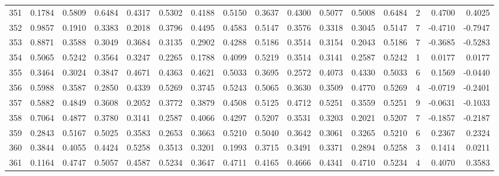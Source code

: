 \begin{tabular}{lrrrrrrrrrrrrrrr}
351 &      0.1784 &  0.5809 &  0.6484 &  0.4317 &  0.5302 &  0.4188 &  0.5150 &  0.3637 &  0.4300 &  0.5077 &   0.5008 &     0.6484 &      2 &                    0.4700 &                     0.4025 \\
352 &      0.9857 &  0.1910 &  0.3383 &  0.2018 &  0.3796 &  0.4495 &  0.4583 &  0.5147 &  0.3576 &  0.3318 &   0.3045 &     0.5147 &      7 &                   -0.4710 &                    -0.7947 \\
353 &      0.8871 &  0.3588 &  0.3049 &  0.3684 &  0.3135 &  0.2902 &  0.4288 &  0.5186 &  0.3514 &  0.3154 &   0.2043 &     0.5186 &      7 &                   -0.3685 &                    -0.5283 \\
354 &      0.5065 &  0.5242 &  0.3564 &  0.3247 &  0.2265 &  0.1788 &  0.4099 &  0.5219 &  0.3514 &  0.3141 &   0.2587 &     0.5242 &      1 &                    0.0177 &                     0.0177 \\
355 &      0.3464 &  0.3024 &  0.3847 &  0.4671 &  0.4363 &  0.4621 &  0.5033 &  0.3695 &  0.2572 &  0.4073 &   0.4330 &     0.5033 &      6 &                    0.1569 &                    -0.0440 \\
356 &      0.5988 &  0.3587 &  0.2850 &  0.4339 &  0.5269 &  0.3745 &  0.5243 &  0.5065 &  0.3630 &  0.3509 &   0.4770 &     0.5269 &      4 &                   -0.0719 &                    -0.2401 \\
357 &      0.5882 &  0.4849 &  0.3608 &  0.2052 &  0.3772 &  0.3879 &  0.4508 &  0.5125 &  0.4712 &  0.5251 &   0.3559 &     0.5251 &      9 &                   -0.0631 &                    -0.1033 \\
358 &      0.7064 &  0.4877 &  0.3780 &  0.3141 &  0.2587 &  0.4066 &  0.4297 &  0.5207 &  0.3531 &  0.3203 &   0.2021 &     0.5207 &      7 &                   -0.1857 &                    -0.2187 \\
359 &      0.2843 &  0.5167 &  0.5025 &  0.3583 &  0.2653 &  0.3663 &  0.5210 &  0.5040 &  0.3642 &  0.3061 &   0.3265 &     0.5210 &      6 &                    0.2367 &                     0.2324 \\
360 &      0.3844 &  0.4055 &  0.4424 &  0.5258 &  0.3513 &  0.3201 &  0.1993 &  0.3715 &  0.3491 &  0.3371 &   0.2894 &     0.5258 &      3 &                    0.1414 &                     0.0211 \\
361 &      0.1164 &  0.4747 &  0.5057 &  0.4587 &  0.5234 &  0.3647 &  0.4711 &  0.4165 &  0.4666 &  0.4341 &   0.4710 &     0.5234 &      4 &                    0.4070 &                     0.3583 \\

\end{tabular}
